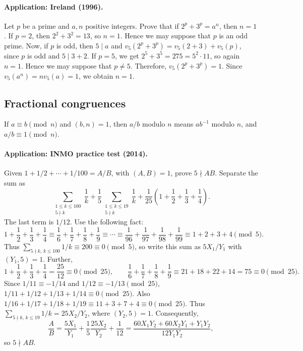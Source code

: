\documentclass[11pt,a4paper]{article}
\begin{document}
\paragraph{Application: Ireland (1996).}
Let $p$ be a prime and $a,n$ positive integers.
Prove that if $2^p+3^p=a^n$, then $n=1$.
If $p=2$, then $2^2+3^2=13$, so $n=1$.
Hence we may suppose that $p$ is an odd prime.
Now, if $p$ is odd, then $5\mid a$ and
$v_5(2^p+3^p)=v_5(2+3)+v_5(p)$, since $p$ is odd and $5\mid3+2$.
If $p=5$, we get $2^5+3^5=275=5^2\cdot11$, so again $n=1$.
Hence we may suppose that $p\neq5$.
Therefore, $v_5(2^p+3^p)=1$.
Since $v_5(a^n)=n v_5(a)=1$, we obtain $n=1$.

\subsection{Fractional congruences}
\setcounter{theorem}{99}\begin{lemma}\label{lemma:lb2-103}
If $a\equiv b\pmod n$ and $(b,n)=1$, then $a/b$ modulo $n$ means $ab^{-1}$ modulo $n$, and $a/b\equiv1\pmod n$.
\end{lemma}
\paragraph{Application: INMO practice test (2014).}
Given $1+1/2+\cdots+1/100=A/B$, with $(A,B)=1$, prove $5\nmid AB$.
Separate the sum as
\[
\sum_{\substack{1\leq k\leq100\\5\nmid k}}\frac1k
+\frac15\sum_{\substack{1\leq k\leq19\\5\nmid k}}\frac1k
+\frac1{25}\left(1+\frac12+\frac13+\frac14\right).
\]
The last term is $1/12$. Use the following fact:
\[
1+\frac12+\frac13+\frac14
\equiv\frac16+\frac17+\frac18+\frac19
\equiv\cdots\equiv\frac1{96}+\frac1{97}+\frac1{98}+\frac1{99}
\equiv1+2+3+4\pmod5.
\]
Thus $\sum_{5\nmid k,\,k\leq100}1/k\equiv200\equiv0\pmod5$,
so write this sum as $5X_1/Y_1$ with $(Y_1,5)=1$.
Further,
\[
1+\frac12+\frac13+\frac14=\frac{25}{12}\equiv0\pmod{25},\qquad
\frac16+\frac17+\frac18+\frac19\equiv21+18+22+14=75\equiv0\pmod{25}.
\]
Since $1/11\equiv-1/14$ and $1/12\equiv-1/13\pmod{25}$,
$1/11+1/12+1/13+1/14\equiv0\pmod{25}$.
Also
$1/16+1/17+1/18+1/19\equiv11+3+7+4\equiv0\pmod{25}$.
Thus $\sum_{5\nmid k,\,k\leq19}1/k=25X_2/Y_2$, where $(Y_2,5)=1$.
Consequently,
\[
\frac AB=\frac{5X_1}{Y_1}+\frac15\frac{25X_2}{Y_2}+\frac1{12}
=\frac{60X_1Y_2+60X_2Y_1+Y_1Y_2}{12Y_1Y_2},
\]
so $5\nmid AB$.
\end{document}
